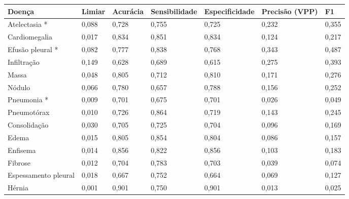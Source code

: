 \begin{tabular}{lllllll}
\toprule
Doença & Limiar & Acurácia & Sensibilidade & Especificidade & Precisão (VPP) & F1 \\
\midrule
Atelectasia * & 0,088 & 0,728 & 0,755 & 0,725 & 0,232 & 0,355 \\
Cardiomegalia & 0,017 & 0,834 & 0,851 & 0,834 & 0,124 & 0,217 \\
Efusão pleural * & 0,082 & 0,777 & 0,838 & 0,768 & 0,343 & 0,487 \\
Infiltração & 0,149 & 0,628 & 0,689 & 0,615 & 0,275 & 0,393 \\
Massa & 0,048 & 0,805 & 0,712 & 0,810 & 0,171 & 0,276 \\
Nódulo & 0,066 & 0,780 & 0,657 & 0,788 & 0,156 & 0,252 \\
Pneumonia * & 0,009 & 0,701 & 0,675 & 0,701 & 0,026 & 0,049 \\
Pneumotórax & 0,010 & 0,726 & 0,864 & 0,719 & 0,143 & 0,245 \\
Consolidação & 0,030 & 0,705 & 0,725 & 0,704 & 0,096 & 0,169 \\
Edema & 0,015 & 0,805 & 0,854 & 0,804 & 0,086 & 0,157 \\
Enfisema & 0,014 & 0,856 & 0,822 & 0,856 & 0,103 & 0,183 \\
Fibrose & 0,012 & 0,704 & 0,783 & 0,703 & 0,039 & 0,074 \\
Espessamento pleural & 0,018 & 0,667 & 0,752 & 0,664 & 0,069 & 0,127 \\
Hérnia & 0,001 & 0,901 & 0,750 & 0,901 & 0,013 & 0,025 \\
\bottomrule
\end{tabular}
